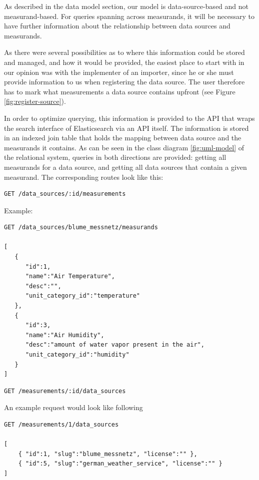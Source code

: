As described in the data model section, our model is data-source-based
and not measurand-based. For queries spanning across measurands, it will
be necessary to have further information about the relationship between
data sources and measurands.

As there were several possibilities as to where this information could
be stored and managed, and how it would be provided, the easiest place
to start with in our opinion was with the implementer of an importer,
since he or she must provide information to us when registering the data
source. The user therefore has to mark what measurements a data source
contains upfront (see Figure \ref{fig:register-source}).

In order to optimize querying, this information is provided to the API
that wraps the search interface of Elasticsearch via an API itself. The
information is stored in an indexed join table that holds the mapping
between data source and the measurands it contains. As can be seen in
the class diagram \ref{fig:uml-model} of the relational system, queries
in both directions are provided: getting all measurands for a data
source, and getting all data sources that contain a given measurand. The
corresponding routes look like this:

\begin{verbatim}
GET /data_sources/:id/measurements
\end{verbatim}

Example:

\begin{verbatim}
GET /data_sources/blume_messnetz/measurands

[
   {
      "id":1,
      "name":"Air Temperature",
      "desc":"",
      "unit_category_id":"temperature"
   },
   {
      "id":3,
      "name":"Air Humidity",
      "desc":"amount of water vapor present in the air",
      "unit_category_id":"humidity"
   }
]
\end{verbatim}

\begin{verbatim}
GET /measurements/:id/data_sources
\end{verbatim}

An example request would look like following

\begin{verbatim}
GET /measurements/1/data_sources

[
    { "id":1, "slug":"blume_messnetz", "license":"" },
    { "id":5, "slug":"german_weather_service", "license":"" }
]
\end{verbatim}

